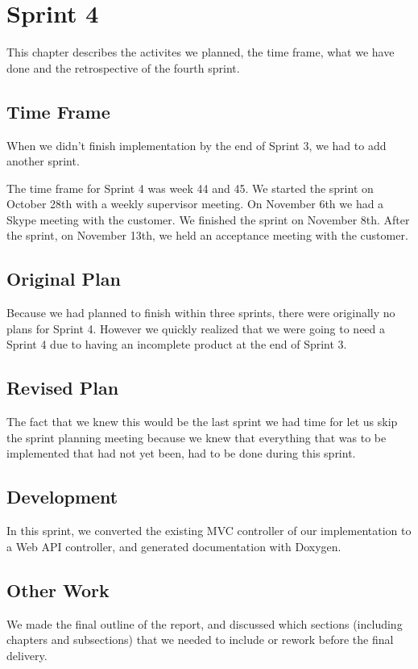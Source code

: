 \chapter{Sprint 4}
This chapter describes the activites we planned, the time frame, what we have done and the retrospective of the fourth sprint. 
\newpage 

\section{Time Frame}
When we didn't finish implementation by the end of Sprint 3, we had to add another sprint.

The time frame for Sprint 4 was week 44 and 45. We started the sprint on October 28th with a weekly supervisor meeting. On November 6th we had a Skype meeting with the customer. We finished the sprint on November 8th. After the sprint, on November 13th, we held an acceptance meeting with the customer.

\section{Original Plan}
Because we had planned to finish within three sprints, there were originally no plans for Sprint 4. However we quickly realized that we were going to need a Sprint 4 due to having an incomplete product at the end of Sprint 3.

\section{Revised Plan}
The fact that we knew this would be the last sprint we had time for let us skip the sprint planning meeting because we knew that everything that was to be implemented that had not yet been, had to be done during this sprint.

\section{Development}
In this sprint, we converted the existing MVC controller of our implementation to a Web API controller, and generated documentation with Doxygen.

\section{Other Work}
We made the final outline of the report, and discussed which sections (including chapters and subsections) that we needed to include or rework before the final delivery.


